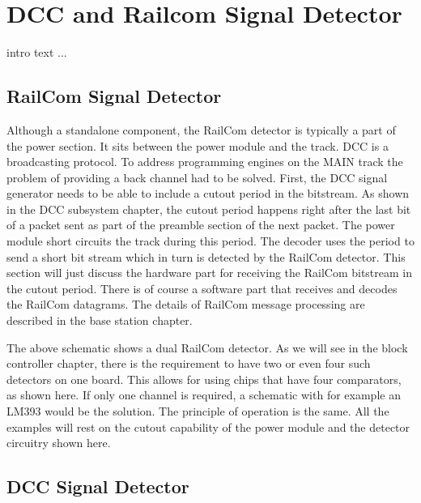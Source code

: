 \chapter{DCC and Railcom Signal Detector}

intro text ...


\section{RailCom Signal Detector}

Although a standalone component, the RailCom detector is typically a part of the power section. It sits between the power module and the track. DCC is a broadcasting protocol. To address programming engines on the MAIN track the problem of providing a back channel had to be solved. First, the DCC signal generator needs to be able to include a cutout period in the bitstream. As shown in the DCC subsystem chapter, the cutout period happens right after the last bit of a packet sent as part of the preamble section of the next packet. The power module short circuits the track during this period. The decoder uses the period to send a short bit stream which in turn is detected by the RailCom detector. This section will just discuss the hardware part for receiving the RailCom bitstream in the cutout period. There is of course a software part that receives and decodes the RailCom datagrams. The details of RailCom message processing are described in the base station chapter.


The above schematic shows a dual RailCom detector. As we will see in the block controller chapter, there is the requirement to have two or even four such detectors on one board. This allows for using chips that have four comparators, as shown here. If only one channel is required, a schematic with for example an LM393 would be the solution. The principle of operation is the same. All the examples will rest on the cutout capability of the power module and the detector circuitry shown here.

\section{DCC Signal Detector}

